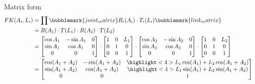 \documentclass[compress]{beamer}
\begin{document}
\begin{frame}{Matrix form}
    {\scriptsize
    \begin{align*}
        FK(A_i,L_i) &= \prod \bubblemark{joint_matrix}R_i(A_i)\cdot T_i(L_i)\bubblemark{link_matrix} \\
                              &= R(A_1)\cdot T(L_1)\cdot R(A_2)\cdot T(L_2) \\
                            &= \begin{bmatrix}\cos A_1 & -\sin A_1 & 0 \\
                                            \sin A_1 & \cos A_1 & 0 \\
                                                        0 &0 &1 \end{bmatrix}\cdot
                                \begin{bmatrix} 1 & 0 & L_1 \\
                                                0 & 1 & 0 \\
                                                0 & 0 & 1 \end{bmatrix}\cdot
                                \begin{bmatrix}\cos A_2 & -\sin A_2 & 0 \\
                                            \sin A_2 & \cos A_2 & 0 \\
                                                        0 &0 &1 \end{bmatrix}\cdot
                                \begin{bmatrix} 1 & 0 & L_2 \\
                                                0 & 1 & 0 \\
                                                0 & 0 & 1 \end{bmatrix} \\
                            &=  \begin{bmatrix} \cos(A_1 + A_2) & -\sin(A_1 + A_2) & \highlight<4>{L_1 \cos(A_1) + L_2 \cos(A_1 + A_2)} \\
                                                \sin(A_1 + A_2) & \cos(A_1 + A_2) & \highlight<4>{L_1 \sin(A_1) + L_2 \sin(A_1 + A_2)} \\
                                                0 & 0 & 1 \end{bmatrix}
    \end{align*}
    }
\end{frame}
\end{document}
